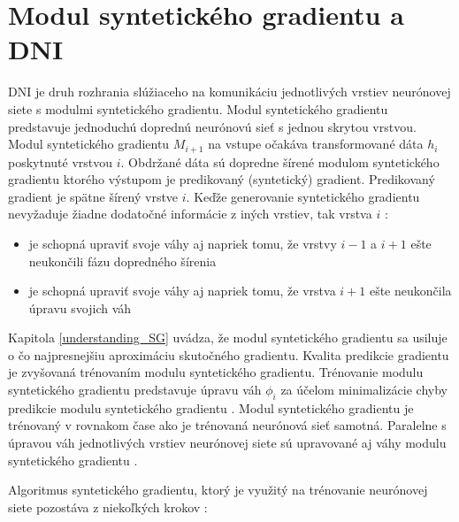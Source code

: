 \section{Modul syntetického gradientu a DNI}
\label{SGaDNI}

DNI je druh rozhrania slúžiaceho na komunikáciu jednotlivých vrstiev neurónovej siete s modulmi syntetického gradientu. Modul syntetického gradientu predstavuje jednoduchú doprednú neurónovú sieť s jednou skrytou vrstvou. Modul syntetického gradientu $M_{i+1}$ na vstupe očakáva transformované dáta $h_i$ poskytnuté vrstvou $i$. Obdržané dáta sú dopredne šírené modulom syntetického gradientu ktorého výstupom je predikovaný (syntetický) gradient. Predikovaný gradient je spätne šírený vrstve $i$. Keďže generovanie syntetického gradientu nevyžaduje žiadne dodatočné informácie z iných vrstiev, tak vrstva $i$ \cite{Jaderberg2016}:
\begin{itemize}
\item je schopná upraviť svoje váhy aj napriek tomu, že vrstvy $i-1$ a $i+1$ ešte neukončili fázu dopredného šírenia
\item je schopná upraviť svoje váhy aj napriek tomu, že vrstva $i+1$ ešte neukončila úpravu svojich váh
\end{itemize}

Kapitola \ref{understanding_SG} uvádza, že modul syntetického gradientu sa usiluje o čo najpresnejšiu aproximáciu skutočného gradientu. Kvalita predikcie gradientu je zvyšovaná trénovaním modulu syntetického gradientu. Trénovanie modulu syntetického gradientu predstavuje úpravu váh $\phi_i$ za účelom minimalizácie chyby predikcie modulu syntetického gradientu \cite{Jaderberg2016}. Modul syntetického gradientu je trénovaný v rovnakom čase ako je trénovaná neurónová sieť samotná.  Paralelne s úpravou váh jednotlivých vrstiev neurónovej siete sú upravované aj váhy modulu syntetického gradientu \cite{Czarnecki2017}.

Algoritmus syntetického gradientu, ktorý je využitý na trénovanie neurónovej siete pozostáva z niekoľkých krokov \cite{Jaderberg2016, Czarnecki2017}:

